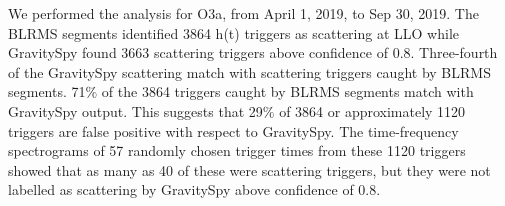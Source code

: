 \documentclass[12pt]{iopart}
\begin{document}


We performed the analysis for O3a, from April 1, 2019, to Sep 30, 2019. The BLRMS segments identified 3864 h(t) triggers as scattering at LLO while GravitySpy found 3663 scattering triggers above confidence of 0.8.  Three-fourth of the GravitySpy scattering match with scattering triggers caught by BLRMS segments. 71$\%$ of the 3864 triggers caught by BLRMS segments match with GravitySpy output. This suggests that 29$\%$ of 3864 or approximately 1120 triggers are false positive with respect to GravitySpy. 
The time-frequency spectrograms of 57 randomly chosen trigger times from these 1120 triggers showed that as many as 40 of these were scattering triggers, but they were not labelled as scattering by GravitySpy above confidence of 0.8. 
\end{document}
